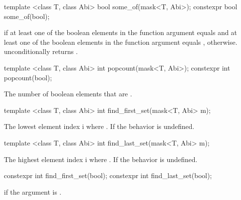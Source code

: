 \begin{itemdecl}
template <class T, class Abi> bool some_of(mask<T, Abi>);
constexpr bool some_of(bool);
\end{itemdecl}
\begin{itemdescr}
  \pnum\returns \true if at least one of the boolean elements in the function argument equals \true and at least one of the boolean elements in the function argument equals \false, \false otherwise.
  \pnum\realnote {} unconditionally returns \false.
\end{itemdescr}

\begin{itemdecl}
template <class T, class Abi> int popcount(mask<T, Abi>);
constexpr int popcount(bool);
\end{itemdecl}
\begin{itemdescr}
  \pnum\returns The number of boolean elements that are \true.
\end{itemdescr}

\begin{itemdecl}
template <class T, class Abi> int find_first_set(mask<T, Abi> m);
\end{itemdecl}
\begin{itemdescr}
  \pnum\returns The lowest element index \code i where .
  \pnum\remarks If  the behavior is undefined.
\end{itemdescr}

\begin{itemdecl}
template <class T, class Abi> int find_last_set(mask<T, Abi> m);
\end{itemdecl}
\begin{itemdescr}
  \pnum\returns The highest element index \code i where .
  \pnum\remarks If  the behavior is undefined.
\end{itemdescr}

\begin{itemdecl}
constexpr int find_first_set(bool);
constexpr int find_last_set(bool);
\end{itemdecl}
\begin{itemdescr}
  \pnum{} if the argument is \true.
\end{itemdescr}


